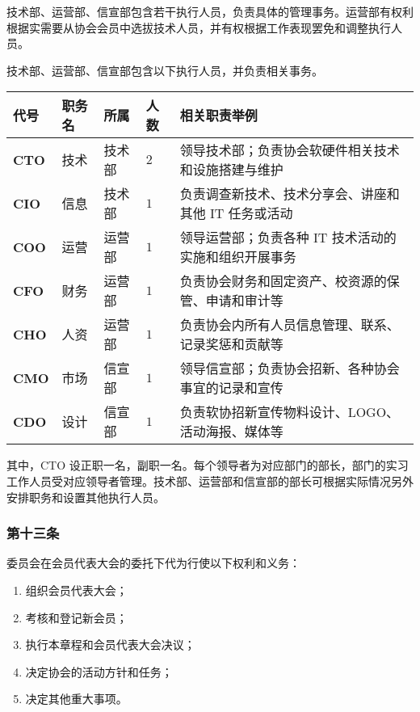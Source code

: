 \documentclass[
]{ctexart}
\begin{document}
技术部、运营部、信宣部包含若干执行人员，负责具体的管理事务。运营部有权利根据实需要从协会会员中选拔技术人员，并有权根据工作表现罢免和调整执行人员。

技术部、运营部、信宣部包含以下执行人员，并负责相关事务。

{
\footnotesize
\begin{longtable}[]{@{}lllll@{}}
\toprule()
\textbf{代号} & \textbf{职务名} & \textbf{所属} & \textbf{人数} & \textbf{相关职责举例} \\
\midrule()
\endhead
\textbf{CTO} & 技术 & 技术部 & \(2\) &
领导技术部；负责协会软硬件相关技术和设施搭建与维护 \\
\textbf{CIO} & 信息 & 技术部 & \(1\) &
负责调查新技术、技术分享会、讲座和其他 IT 任务或活动 \\
\textbf{COO} & 运营 & 运营部 & \(1\) & 领导运营部；负责各种 IT
技术活动的实施和组织开展事务 \\
\textbf{CFO} & 财务 & 运营部 & \(1\) &
负责协会财务和固定资产、校资源的保管、申请和审计等 \\
\textbf{CHO} & 人资 & 运营部 & \(1\) &
负责协会内所有人员信息管理、联系、记录奖惩和贡献等 \\
\textbf{CMO} & 市场 & 信宣部 & \(1\) &
领导信宣部；负责协会招新、各种协会事宜的记录和宣传 \\
\textbf{CDO} & 设计 & 信宣部 & \(1\) &
负责软协招新宣传物料设计、LOGO、活动海报、媒体等 \\
\bottomrule()
\end{longtable}
}
其中，CTO
设正职一名，副职一名。每个领导者为对应部门的部长，部门的实习工作人员受对应领导者管理。技术部、运营部和信宣部的部长可根据实际情况另外安排职务和设置其他执行人员。

\hypertarget{ux7b2cux5341ux4e09ux6761-ux59d4ux5458ux4f1aux7684ux6743ux5229ux548cux4e49ux52a1}{%
\subsubsection{第十三条}\label{ux7b2cux5341ux4e09ux6761-ux59d4ux5458ux4f1aux7684ux6743ux5229ux548cux4e49ux52a1}}

委员会在会员代表大会的委托下代为行使以下权利和义务：

\begin{enumerate}
\def\labelenumi{\arabic{enumi}.}
\item
  组织会员代表大会；
\item
  考核和登记新会员；
\item
  执行本章程和会员代表大会决议；
\item
  决定协会的活动方针和任务；
\item
  决定其他重大事项。
\end{enumerate}
\end{document}
